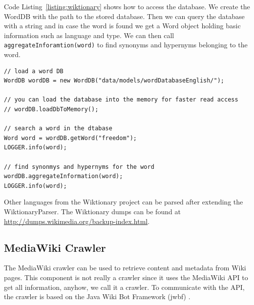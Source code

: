 Code Listing~\ref{listing:wiktionary} shows how to access the database. We create the WordDB with the path to the stored database. Then we can query the database with a string and in case the word is found we get a Word object holding basic information such as language and type. We can then call \verb+aggregateInforamtion(word)+ to find synonyms and hypernyms belonging to the word.

\begin{codelisting}
\begin{lstlisting}[caption=Using the interface to the Wiktionary WordDB.,frame=tb,label=listing:wiktionary]
// load a word DB
WordDB wordDB = new WordDB("data/models/wordDatabaseEnglish/");

// you can load the database into the memory for faster read access
// wordDB.loadDbToMemory();

// search a word in the dtabase
Word word = wordDB.getWord("freedom");
LOGGER.info(word);

// find synonmys and hypernyms for the word
wordDB.aggregateInformation(word);
LOGGER.info(word);
\end{lstlisting}
\end{codelisting}

Other languages from the Wiktionary project can be parsed after extending the WiktionaryParser. The Wiktionary dumps can be found at \url{http://dumps.wikimedia.org/backup-index.html}.

\subsection{MediaWiki Crawler}\label{sec:MWCrawler}
The MediaWiki crawler can be used to retrieve content and metadata from Wiki pages. This component is not really a crawler since it uses the MediaWiki API \cite{MWAPI2011} to get all information, anyhow, we call it a crawler. To communicate with the API, the crawler is based on the Java Wiki Bot Framework (jwbf) \cite{jwbf2011}. 

